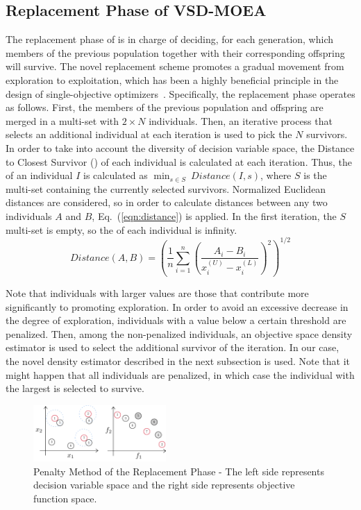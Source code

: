 \subsection{Replacement Phase of VSD-MOEA}

The replacement phase of \EAS{} is in charge of deciding, for each generation, which members of the previous population together with their corresponding offspring will survive.
%
The novel replacement scheme promotes a gradual movement from exploration to exploitation, which has been a highly 
beneficial principle in the design of single-objective optimizers~\cite{Joel:MULTI_DYNAMIC}.
%
Specifically, the replacement phase operates as follows.
%
First, the members of the previous population and offspring are merged in a multi-set with $2 \times N$ individuals.
%
Then, an iterative process that selects an additional
individual at each iteration is used to pick the $N$ survivors. 
%
In order to take into account the diversity of decision variable space, the Distance to Closest Survivor (\DCS{}) of each
individual is calculated at each iteration.
%
Thus, the \DCS{} of an individual $I$ is calculated as $\displaystyle{\min_{s \in S}\ Distance(I, s)}$,
where $S$ is the multi-set containing the currently selected survivors. 
%
Normalized Euclidean distances are considered, so in order to calculate distances between any two individuals $A$ and $B$, 
Eq.~(\ref{eqn:distance}) is applied.
%
In the first iteration, the $S$ multi-set is empty, so the \DCS{} of each individual is infinity.
%
\begin{equation}\label{eqn:distance}
Distance(A, B) =   \left ( \frac{1}{n}  \sum_{i=1}^n \left ( \frac{A_i - B_i}{x_i^{(U)} - x_i^{(L)}} \right )^2  \right)^{1/2}
\end{equation}

Note that individuals with larger \DCS{} values are those that contribute more significantly to promoting exploration.
%
In order to avoid an excessive decrease in the degree of exploration, individuals with a \DCS{} value below a certain threshold are penalized.
%
Then, among the non-penalized individuals, an objective space density estimator is used to select the additional
survivor of the iteration.
%
In our case, the novel density estimator described in the next subsection is used. 
%
Note that it might happen that all individuals are penalized, in which case the individual with the largest \DCS{} is selected to survive.

\begin{figure}[t]
\centering
\includegraphics[width=0.45\textwidth]{Images/Diagram.pdf}
\caption{Penalty Method of the Replacement Phase - The left side represents decision variable space and the right side represents 
objective function space.} \label{fig:Hypersphere}
\end{figure}

